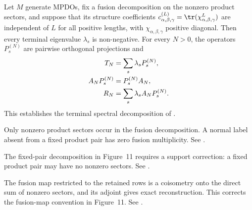 \begin{lemma}%
    \label{thm:mpdo_fusion_clause_terminal_spectral_projector_refinement}
    \leanok
    Let $M$ generate MPDOs, fix a fusion decomposition on the nonzero product
    sectors, and suppose that its structure coefficients
    $c_{\alpha,\beta,\gamma}^{(L)}
        =\tr(\chi_{\alpha,\beta,\gamma}^{L})$ are independent of $L$ for all
    positive lengths, with $\chi_{\alpha,\beta,\gamma}$ positive diagonal.
    Then every terminal eigenvalue $\lambda_s$ is non-negative. For every
    $N>0$, the operators $P_s^{(N)}$ are pairwise orthogonal projections and
    \begin{align}
        T_N          & =\sum_s\lambda_sP_s^{(N)},
        \notag                                       \\
        A_NP_s^{(N)} & =P_s^{(N)}A_N,
        \notag                                       \\
        R_N          & =\sum_s\lambda_sA_NP_s^{(N)}.
        \notag
    \end{align}
    This establishes the terminal spectral decomposition of
    \cite[lines~1003--1012]{Cirac2016MPDO_arXiv}.

    Only nonzero product sectors occur in the fusion decomposition. A normal
    label absent from a fixed product pair has zero fusion multiplicity. See
    \cite{gap:cpsv16_bnt_uniqueness_zero_coefficient}.

    The fixed-pair decomposition in Figure~11 requires a support correction:
    a fixed product pair may have no nonzero sectors. See
    \cite{gap:cpsv16_figure11_per_pair_support}.

    The fusion map restricted to the retained rows is a coisometry onto the
    direct sum of nonzero sectors, and its adjoint gives exact reconstruction.
    This corrects the fusion-map convention in Figure~11. See
    \cite{gap:cpsv16_figure11_fusion_coisometry}.
\end{lemma}
